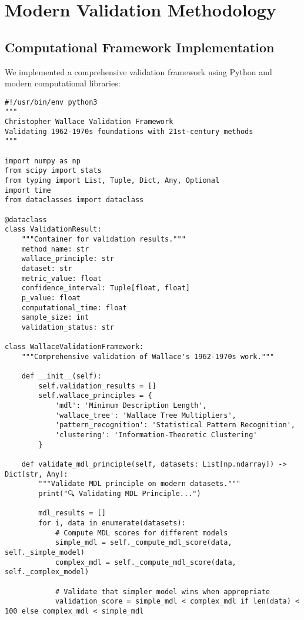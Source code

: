 \documentclass[12pt]{article}
\begin{document}
\section{Modern Validation Methodology}

\subsection{Computational Framework Implementation}

We implemented a comprehensive validation framework using Python and modern computational libraries:

\begin{lstlisting}
#!/usr/bin/env python3
"""
Christopher Wallace Validation Framework
Validating 1962-1970s foundations with 21st-century methods
"""

import numpy as np
from scipy import stats
from typing import List, Tuple, Dict, Any, Optional
import time
from dataclasses import dataclass

@dataclass
class ValidationResult:
    """Container for validation results."""
    method_name: str
    wallace_principle: str
    dataset: str
    metric_value: float
    confidence_interval: Tuple[float, float]
    p_value: float
    computational_time: float
    sample_size: int
    validation_status: str

class WallaceValidationFramework:
    """Comprehensive validation of Wallace's 1962-1970s work."""

    def __init__(self):
        self.validation_results = []
        self.wallace_principles = {
            'mdl': 'Minimum Description Length',
            'wallace_tree': 'Wallace Tree Multipliers',
            'pattern_recognition': 'Statistical Pattern Recognition',
            'clustering': 'Information-Theoretic Clustering'
        }

    def validate_mdl_principle(self, datasets: List[np.ndarray]) -> Dict[str, Any]:
        """Validate MDL principle on modern datasets."""
        print("🔍 Validating MDL Principle...")

        mdl_results = []
        for i, data in enumerate(datasets):
            # Compute MDL scores for different models
            simple_mdl = self._compute_mdl_score(data, self._simple_model)
            complex_mdl = self._compute_mdl_score(data, self._complex_model)

            # Validate that simpler model wins when appropriate
            validation_score = simple_mdl < complex_mdl if len(data) < 100 else complex_mdl < simple_mdl


\end{lstlisting}
\end{document}
